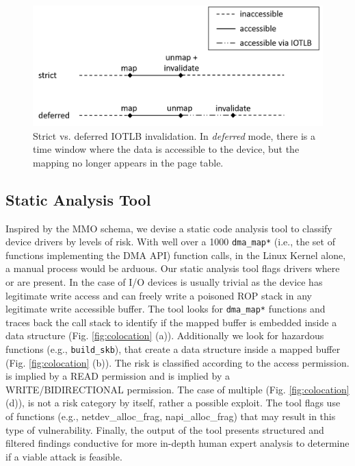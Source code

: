 \begin{figure}[t]
    \centering
    \includegraphics[width=1.3\columnwidth]{figs/deferred.png}
    \caption{Strict vs. deferred IOTLB invalidation. In \emph{deferred} mode, there is a time window where the data is accessible to the device, but the mapping no longer appears in the page table.}
    \label{fig:deferred}
\end{figure}
\subsection{Static Analysis Tool}

Inspired by the MMO schema, we devise a static code analysis tool to classify device drivers by levels of risk. With well over a 1000 \texttt{dma\_map*} (i.e., the set of functions implementing the DMA API) function calls, in the Linux Kernel alone, a manual process would be arduous.
Our static analysis tool flags drivers where \means{} or \oportunity{} are present. In the case of I/O devices \motivation{} is usually trivial as the device has legitimate write access and can freely write a poisoned ROP stack in any legitimate write accessible buffer. The tool looks for \texttt{dma\_map*} functions and traces back the call stack to identify if the mapped buffer is embedded inside a data structure (Fig. \ref{fig:colocation} (a)). Additionally we look for hazardous functions (e.g., \texttt{build\_skb}), that create a data structure inside a mapped buffer (Fig. \ref{fig:colocation} (b)). The risk is classified according to the access permission. \means{} is implied by a READ permission and \oportunity{} is implied by a WRITE/BIDIRECTIONAL permission. The case of multiple \iova{} (Fig. \ref{fig:colocation} (d)), is not a risk category by itself, rather a possible exploit. The tool flags use of functions (e.g., netdev\_alloc\_frag, napi\_alloc\_frag) that may result in this type of vulnerability.
Finally, the output of the tool presents structured and filtered findings conductive for more in-depth human expert analysis to determine if a viable attack is feasible. 

